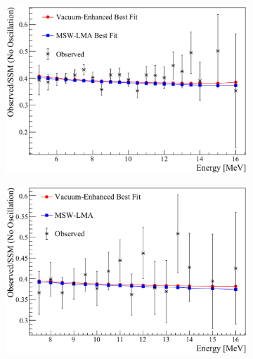 \begin{figure}[htbp]
  \centering
\begin{subfigure}[b]{0.48\textwidth}
    \centering
    \includegraphics[width=\textwidth]{superk1_bf_solar_only}
    \caption[]{}
  \end{subfigure}
  \hfill
\begin{subfigure}[b]{0.48\textwidth}
    \centering
    \includegraphics[width=\textwidth]{superk2_bf_solar_only}
    \caption[]{}
  \end{subfigure}


\end{figure}
